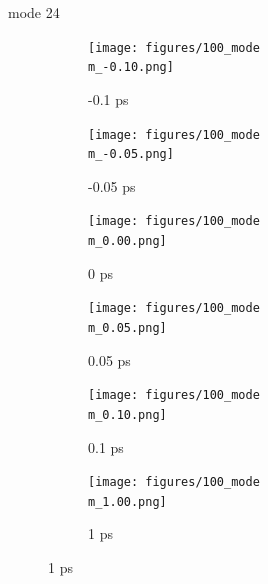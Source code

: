 \documentclass{beamer}
\newcommand\w{0.32}
\begin{document}
\renewcommand\m{24}
\begin{frame}{mode \m}
	\begin{figure}
		\centering
		\begin{subfigure}[b]{\w\textwidth}
			\centering
			\texttt{[image: figures/100\_mode\\m\_-0.10.png]}
			\caption{-0.1 ps}
		\end{subfigure}
		\begin{subfigure}[b]{\w\textwidth}
			\centering
			\texttt{[image: figures/100\_mode\\m\_-0.05.png]}
			\caption{-0.05 ps}
		\end{subfigure}
		\begin{subfigure}[b]{\w\textwidth}
			\centering
			\texttt{[image: figures/100\_mode\\m\_0.00.png]}
			\caption{0 ps}
		\end{subfigure}
		\begin{subfigure}[b]{\w\textwidth}
			\centering
			\texttt{[image: figures/100\_mode\\m\_0.05.png]}
			\caption{0.05 ps}
		\end{subfigure}
		\begin{subfigure}[b]{\w\textwidth}
			\centering
			\texttt{[image: figures/100\_mode\\m\_0.10.png]}
			\caption{0.1 ps}
		\end{subfigure}
		\begin{subfigure}[b]{\w\textwidth}
			\centering
			\texttt{[image: figures/100\_mode\\m\_1.00.png]}
			\caption{1 ps}
		\end{subfigure}
	\end{figure}
\end{frame}
\end{document}
